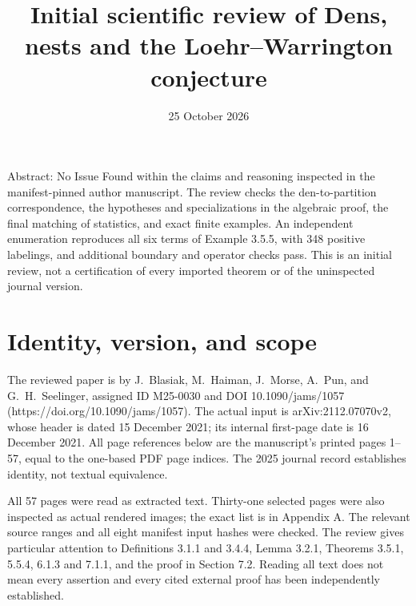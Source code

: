 \documentclass[10pt]{article}
\title{Initial scientific review of
Dens, nests and the Loehr–Warrington conjecture}
\author{}
\date{25 October 2026}
\begin{document}
\maketitle
Abstract: No Issue Found within the claims and reasoning inspected in the manifest-pinned author manuscript. The review checks the den-to-partition correspondence, the hypotheses and specializations in the algebraic proof, the final matching of statistics, and exact finite examples. An independent enumeration reproduces all six terms of Example 3.5.5, with 348 positive labelings, and additional boundary and operator checks pass. This is an initial review, not a certification of every imported theorem or of the uninspected journal version.\par
\section*{Identity, version, and scope}
The reviewed paper is by J. Blasiak, M. Haiman, J. Morse, A. Pun, and G. H. Seelinger, assigned ID M25-0030 and DOI 10.1090/jams/1057 (https://doi.org/10.1090/jams/1057). The actual input is arXiv:2112.07070v2, whose header is dated 15 December 2021; its internal first-page date is 16 December 2021. All page references below are the manuscript’s printed pages 1–57, equal to the one-based PDF page indices. The 2025 journal record establishes identity, not textual equivalence.\par
All 57 pages were read as extracted text. Thirty-one selected pages were also inspected as actual rendered images; the exact list is in Appendix A. The relevant source ranges and all eight manifest input hashes were checked. The review gives particular attention to Definitions 3.1.1 and 3.4.4, Lemma 3.2.1, Theorems 3.5.1, 5.5.4, 6.1.3 and 7.1.1, and the proof in Section 7.2. Reading all text does not mean every assertion and every cited external proof has been independently established.\par
\end{document}
